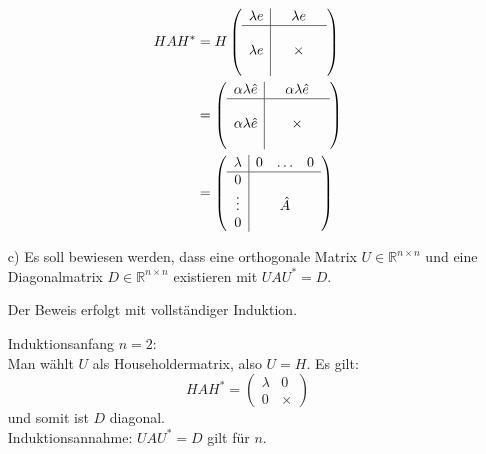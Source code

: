 \documentclass[11pt]{article}
\theoremstyle{plain}
\theoremstyle{definition}
\renewcommand{\a}{\"{a}}
\renewcommand{\u}{\"{u}}
\begin{document}
\begin{itemize}
\begin{align}
HAH^* 
&=
H
\left(
\begin{array}{c|ccc}
\lambda e &  & \lambda e &     \\\hline
  & & &                    \\
\lambda e & & \times &        \\
  & & &
\end{array}
\right)\\
&=
\left(
\begin{array}{c|ccc}
\alpha\lambda\hat{e} &  & \alpha\lambda\hat{e} &     \\\hline
  & & &                    \\
\alpha\lambda\hat{e} & & \times &        \\
  & & &
\end{array}
\right)\\
&=
\left(
\begin{array}{c|ccc}
\lambda &  0 & \hdots &   0  \\\hline
0  & & &                    \\
\vdots & & \hat{A} &        \\
0  & & &
\end{array}
\right)\\
\end{align}


\item[c)]
Es soll bewiesen werden, dass eine orthogonale Matrix $U \in \mathbb{R}^{n \times n}$ und eine Diagonalmatrix $D \in \mathbb{R}^{n \times n}$  existieren mit $UAU^*=D$. 

Der Beweis erfolgt mit vollst\a ndiger Induktion.

Induktionsanfang $n = 2$:\\
Man w\a hlt $U$ als Householdermatrix, also $U=H$. Es gilt:
\begin{equation}
HAH^* =
\begin{pmatrix}
\lambda & 0 \\
0       & \times
\end{pmatrix}
\end{equation}
und somit ist $D$ diagonal.\\

Induktionsannahme: $UAU^*=D$ gilt f\u r $n$.\\


\end{itemize}
\end{document}
